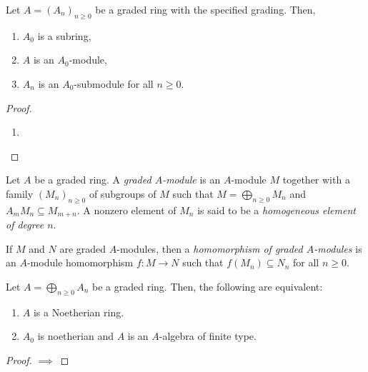 \begin{proposition}
    Let $A = (A_n)_{n\ge 0}$ be a graded ring with the specified grading. Then, 
    \begin{enumerate}[label=(\alph*)]
        \item $A_0$ is a subring, 
        \item $A$ is an $A_0$-module, 
        \item $A_n$ is an $A_0$-submodule for all $n\ge 0$.
    \end{enumerate}
\end{proposition}
\begin{proof}
\begin{enumerate}[label=(\alph*)]
    \item 
\end{enumerate}
\end{proof}

\begin{definition}
    Let $A$ be a graded ring. A \emph{graded $A$-module} is an $A$-module $M$ together with a family $(M_n)_{n\ge 0}$ of subgroups of $M$ such that $M = \bigoplus_{n\ge 0} M_n$ and $A_m M_n\subseteq M_{m + n}$. A nonzero element of $M_n$ is said to be a \emph{homogeneous element of degree $n$}.
\end{definition}

\begin{definition}
    If $M$ and $N$ are graded $A$-modules, then a \emph{homomorphism of graded $A$-modules} is an $A$-module homomorphism $f: M\to N$ such that $f(M_n)\subseteq N_n$ for all $n\ge 0$.
\end{definition}

\begin{proposition}
    Let $A = \bigoplus_{n\ge0} A_n$ be a graded ring. Then, the following are equivalent: 
    \begin{enumerate}[label=(\alph*)]
        \item $A$ is a Noetherian ring. 
        \item $A_0$ is noetherian and $A$ is an $A$-algebra of finite type.
    \end{enumerate}
\end{proposition}
\begin{proof}
    $\implies$ 
\end{proof}

